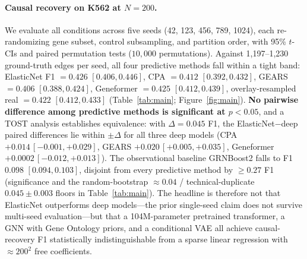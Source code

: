 \documentclass{article}
\theoremstyle{plain}
\theoremstyle{definition}
\theoremstyle{remark}
\begin{document}
\paragraph{Causal recovery on K562 at $N{=}200$.}
We evaluate all conditions across five seeds (42, 123, 456, 789, 1024), each re-randomizing gene subset, control subsampling, and partition order, with 95\% $t$-CIs and paired permutation tests ($10{,}000$ permutations). Against 1{,}197--1{,}230 ground-truth edges per seed, all four predictive methods fall within a tight band: ElasticNet F1 $= 0.426$ $[0.406, 0.446]$, CPA $= 0.412$ $[0.392, 0.432]$, GEARS $= 0.406$ $[0.388, 0.424]$, Geneformer $= 0.425$ $[0.412, 0.439]$, overlay-resampled real $= 0.422$ $[0.412, 0.433]$ (Table~\ref{tab:main}; Figure~\ref{fig:main}). \textbf{No pairwise difference among predictive methods is significant at $p<0.05$}, and a TOST analysis establishes equivalence: with $\Delta = 0.045$ F1, the ElasticNet$-$deep paired differences lie within $\pm\Delta$ for all three deep models (CPA $+0.014\,[-0.001, +0.029]$, GEARS $+0.020\,[+0.005, +0.035]$, Geneformer $+0.0002\,[-0.012, +0.013]$). The observational baseline GRNBoost2 falls to F1 $0.098$ $[0.094, 0.103]$, disjoint from every predictive method by $\geq 0.27$ F1 (significance and the random-bootstrap $\approx 0.04$ / technical-duplicate $0.045 \pm 0.003$ floors in Table~\ref{tab:main}). The headline is therefore not that ElasticNet outperforms deep models---the prior single-seed claim does not survive multi-seed evaluation---but that a 104M-parameter pretrained transformer, a GNN with Gene Ontology priors, and a conditional VAE all achieve causal-recovery F1 statistically indistinguishable from a sparse linear regression with $\approx\!200^2$ free coefficients.
\end{document}
